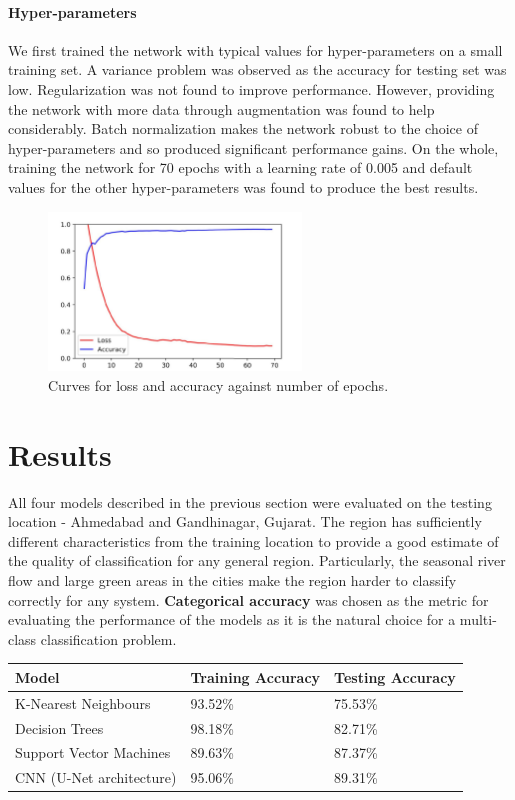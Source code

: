 \documentclass[12pt, a4paper]{report}
\begin{document}
\subsubsection{Hyper-parameters}
We first trained the network with typical values for hyper-parameters on a small training set. A variance problem was observed as the accuracy for testing set was low. Regularization was not found to improve performance. However, providing the network with more data through augmentation was found to help considerably. Batch normalization makes the network robust to the choice of hyper-parameters and so produced significant performance gains. On the whole, training the network for 70 epochs with a learning rate of 0.005 and default values for the other hyper-parameters was found to produce the best results.
\begin{figure}[h]
\centering
\includegraphics[width=0.6\textwidth]{train_history.jpg}
\caption{Curves for loss and accuracy against number of epochs.}
\end{figure}


\chapter{Results}
\vspace{0.5cm}
All four models described in the previous section were evaluated on the testing location - Ahmedabad and Gandhinagar, Gujarat. The region has sufficiently different characteristics from the training location to provide a good estimate of the quality of classification for any general region. Particularly, the seasonal river flow and large green areas in the cities make the region harder to classify correctly for any system. \textbf{Categorical accuracy} was chosen as the metric for evaluating the performance of the models as it is the natural choice for a multi-class classification problem.
\begin{center}
\begin{tabular}{|p{5cm}|p{5cm}|p{5cm}|}
\hline
\textbf{Model} & \textbf{Training Accuracy} & \textbf{Testing Accuracy} \\
\hline
K-Nearest Neighbours & 93.52\% & 75.53\%\\
\hline
Decision Trees & 98.18\% & 82.71\%\\
\hline
Support Vector Machines & 89.63\% & 87.37\%\\
\hline
CNN (U-Net architecture) & 95.06\% & 89.31\%\\
\hline
\end{tabular} 
\end{center}
\end{document}
